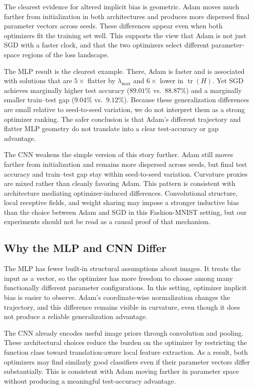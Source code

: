 \documentclass[11pt]{article}
\begin{document}
The clearest evidence for altered implicit bias is geometric. Adam moves much farther from initialization in both architectures and produces more dispersed final parameter vectors across seeds. These differences appear even when both optimizers fit the training set well. This supports the view that Adam is not just SGD with a faster clock, and that the two optimizers select different parameter-space regions of the loss landscape.

The MLP result is the clearest example. There, Adam is faster and is associated with solutions that are $5\times$ flatter by $\lambda_{\max}$ and $6\times$ lower in $\operatorname{tr}(H)$. Yet SGD achieves marginally higher test accuracy ($89.01\%$ vs.\ $88.87\%$) and a marginally smaller train--test gap ($9.04\%$ vs.\ $9.12\%$). Because these generalization differences are small relative to seed-to-seed variation, we do not interpret them as a strong optimizer ranking. The safer conclusion is that Adam's different trajectory and flatter MLP geometry do not translate into a clear test-accuracy or gap advantage.

The CNN weakens the simple version of this story further. Adam still moves farther from initialization and remains more dispersed across seeds, but final test accuracy and train--test gap stay within seed-to-seed variation. Curvature proxies are mixed rather than cleanly favoring Adam. This pattern is consistent with architecture mediating optimizer-induced differences. Convolutional structure, local receptive fields, and weight sharing may impose a stronger inductive bias than the choice between Adam and SGD in this Fashion-MNIST setting, but our experiments should not be read as a causal proof of that mechanism.

\subsection{Why the MLP and CNN Differ}

The MLP has fewer built-in structural assumptions about images. It treats the input as a vector, so the optimizer has more freedom to choose among many functionally different parameter configurations. In this setting, optimizer implicit bias is easier to observe. Adam's coordinate-wise normalization changes the trajectory, and this difference remains visible in curvature, even though it does not produce a reliable generalization advantage.

The CNN already encodes useful image priors through convolution and pooling. These architectural choices reduce the burden on the optimizer by restricting the function class toward translation-aware local feature extraction. As a result, both optimizers may find similarly good classifiers even if their parameter vectors differ substantially. This is consistent with Adam moving farther in parameter space without producing a meaningful test-accuracy advantage.
\end{document}
